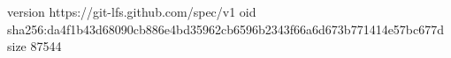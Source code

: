 version https://git-lfs.github.com/spec/v1
oid sha256:da4f1b43d68090cb886e4bd35962cb6596b2343f66a6d673b771414e57bc677d
size 87544
